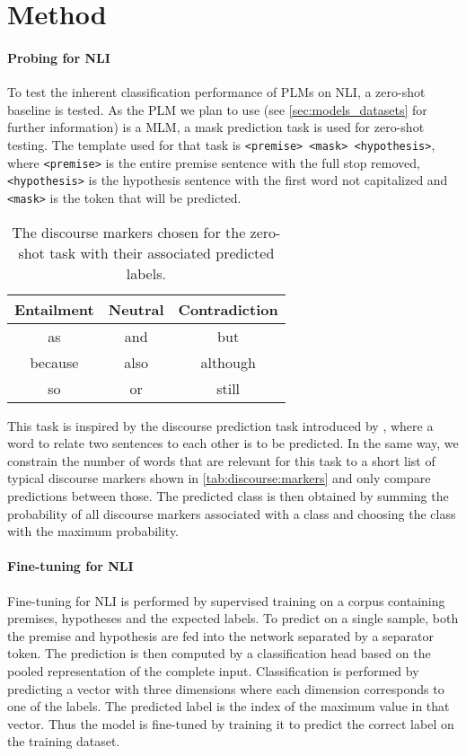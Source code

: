 \section{Method} \label{sec:method}
\paragraph{Probing for \acs{NLI}}
To test the inherent classification performance of \acp{PLM} on \acs{NLI}, a zero-shot baseline is tested. As the \ac{PLM} we plan to use (see \autoref{sec:models_datasets} for further information) is a \ac{MLM}, a mask prediction task is used for zero-shot testing. The template used for that task is \texttt{<premise> <mask> <hypothesis>}, where \texttt{<premise>} is the entire premise sentence with the full stop removed, \texttt{<hypothesis>} is the hypothesis sentence with the first word not capitalized and \texttt{<mask>} is the token that will be predicted.

\begin{table}[ht]
    \centering
    \caption{The discourse markers chosen for the zero-shot task with their associated predicted labels.}
    \begin{tabular}{c | c | c}
        Entailment & Neutral & Contradiction \\
        \hline
        as & and  & but \\
        because & also & although \\
        so & or & still
    \end{tabular}
    \label{tab:discourse:markers}
\end{table}

This task is inspired by the discourse prediction task introduced by \cite{dissent}, where a word to relate two sentences to each other is to be predicted. In the same way, we constrain the number of words that are relevant for this task to a short list of typical discourse markers shown in \autoref{tab:discourse:markers} and only compare predictions between those. The predicted class is then obtained by summing the probability of all discourse markers associated with a class and choosing the class with the maximum probability.

\paragraph{Fine-tuning for \acs{NLI}}

Fine-tuning for \acs{NLI} is performed by supervised training on a corpus containing premises, hypotheses and the expected labels. To predict on a single sample, both the premise and hypothesis are fed into the network separated by a separator token. The prediction is then computed by a classification head based on the pooled representation of the complete input. Classification is performed by predicting a vector with three dimensions where each dimension corresponds to one of the labels. The predicted label is the index of the maximum value in that vector. Thus the model is fine-tuned by training it to predict the correct label on the training dataset.

